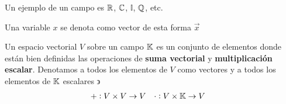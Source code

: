 \begin{remark}
    Un ejemplo de un campo es $\mathbb{R}$, $\mathbb{C}$, $\mathbb{I}$, $\mathbb{Q}$, etc.
\end{remark}

\begin{notation}
    Una variable $x$ se denota como vector de esta forma $\vec{x}$
\end{notation}

\begin{definition}
    Un espacio vectorial $V$ sobre un campo $\mathbb{K}$ es un
conjunto de elementos donde están bien definidas las operaciones de \textbf{suma vectorial} y
\textbf{multiplicación escalar}. Denotamos a todos los elementos de $V$ como vectores y a todos
los elementos de $\mathbb{K}$ escalares $\backepsilon$
    \begin{align*}
         + : V \times V \to V  &&& \cdot : V \times \mathbb{K} \to V 
         \end{align*}


\end{definition}
